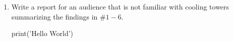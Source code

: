 \documentclass{article}
\begin{document}
\begin{enumerate}
\begin{proof}
    Assuming the cooling tower is constructed with the cheapest concrete from Home Depot, each cubic foot of concrete costs around $10$ dollars. Thus the total cost of the cooling tower should be
    $$218,863.872\text{ ft}^3\cdot\frac{10\text{ dollars}}{\text{ft}^3}=\boxed{2,188,638\text{ dollars}}$$  
\end{proof}

\item Write a report for an audience that is not familiar with cooling towers summarizing the
findings in $\#1-6$.

print('Hello World')

\end{enumerate}
\end{document}
